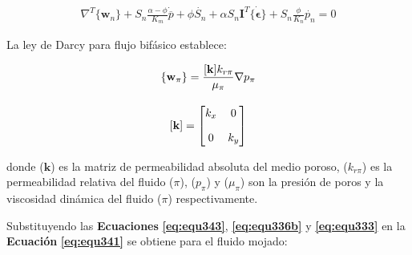 \begin{ceqn} %
\begin{gather}\label{eq:equ342}
\nabla^T \{\mathbf{w}_{n}\} + S_{n} \frac{\alpha - \phi}{K_m}\dot{\overline{p}}+ \phi\dot{S_{n}} + \alpha S_{n}\mathbf{I}^T \dot{\{\mathbf{\epsilon}\}} + S_{n}\frac{\phi}{K_{n}}\dot{p_{n}} = 0
\end{gather}   
\end{ceqn}
\bigskip
La ley de Darcy \cite{Zienkiewicz1999ComputationalGeomechanics} para flujo bifásico establece:

\begin{ceqn} 
\begin{subequations} \label{eq:equ343} 
\begin{gather}
\normalsize{\{\mathbf{w}_{\pi}\} = \frac{[\mathbf{k}] k_{r\pi}}{\mu_{\pi}}\nabla p_{\pi}} \label{eq:equ343a}\\[10pt]
\normalsize{[\mathbf{k}]=\begin{bmatrix} 
k_{x} & 0\\[1em]
0 & k_{y}
\end{bmatrix} } \label{eq:equ343b}
\end{gather}  
\end{subequations} 
\end{ceqn}

donde ($\mathbf{k}$) es la matriz de permeabilidad absoluta del medio poroso, ($k_{r\pi}$) es la permeabilidad relativa del fluido ($\pi$), ($p_{\pi}$) y  ($\mu_{\pi}$) son la presión de poros y la viscosidad dinámica del fluido ($\pi$) respectivamente.\bigskip

Substituyendo las \textbf{Ecuaciones} \textbf{\ref{eq:equ343}}, \textbf{\ref{eq:equ336b}} y \textbf{\ref{eq:equ333}} en la \textbf{Ecuación} \textbf{\ref{eq:equ341}} se obtiene para el fluido mojado:\bigskip

